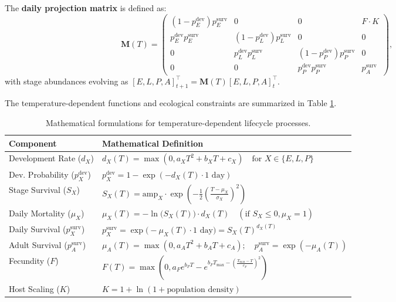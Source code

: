 \documentclass{article}
\begin{document}
The \textbf{daily projection matrix} is defined as:
\begin{equation}
\mathbf{M}(T) = 
\begin{pmatrix}
(1 - p_E^{\text{dev}}) p_E^{\text{surv}} & 0 & 0 & F \cdot K \\
p_E^{\text{dev}} p_E^{\text{surv}} & (1 - p_L^{\text{dev}}) p_L^{\text{surv}} & 0 & 0 \\
0 & p_L^{\text{dev}} p_L^{\text{surv}} & (1 - p_P^{\text{dev}}) p_P^{\text{surv}} & 0 \\
0 & 0 & p_P^{\text{dev}} p_P^{\text{surv}} & p_A^{\text{surv}}
\end{pmatrix},
\end{equation}
with stage abundances evolving as $[E,L,P,A]_{t+1}^\top = \mathbf{M}(T) [E,L,P,A]_t^\top$.

The temperature-dependent functions and ecological constraints are summarized in Table \ref{tab:lifecycle_equations}.

\begin{table}[!htb]
\centering
\caption{Mathematical formulations for temperature-dependent lifecycle processes.}
\label{tab:lifecycle_equations}
\begin{tabular}{@{}ll@{}}
\toprule
\textbf{Component} & \textbf{Mathematical Definition} \\ \midrule
Development Rate ($d_X$) & $d_X(T) = \max(0, a_X T^2 + b_X T + c_X) \quad \text{for } X \in \{E,L,P\}$ \\
Dev. Probability ($p_X^{\text{dev}}$) & $p_X^{\text{dev}} = 1 - \exp(-d_X(T) \cdot 1 \text{ day})$ \\
Stage Survival ($S_X$) & $S_X(T) = \text{amp}_X \cdot \exp\left(-\frac{1}{2}\left(\frac{T - \mu_X}{\sigma_X}\right)^2\right)$ \\
Daily Mortality ($\mu_X$) & $\mu_X(T) = -\ln\bigl(S_X(T)\bigr) \cdot d_X(T) \quad (\text{if } S_X \le 0, \mu_X = 1)$ \\
Daily Survival ($p_X^{\text{surv}}$) & $p_X^{\text{surv}} = \exp\bigl(-\mu_X(T) \cdot 1 \text{ day}\bigr) = S_X(T)^{d_X(T)}$ \\
Adult Survival ($p_A^{\text{surv}}$) & $\mu_A(T) = \max(0, a_A T^2 + b_A T + c_A); \quad p_A^{\text{surv}} = \exp(-\mu_A(T))$ \\
Fecundity ($F$) & $F(T) = \max\left(0, a_F e^{b_F T} - e^{b_F T_{\max} - \left(\frac{T_{\max}-T}{c_F}\right)^2}\right)$ \\
Host Scaling ($K$) & $K = 1 + \ln(1 + \text{population density})$ \\ 
\bottomrule
\end{tabular}
\end{table}
\end{document}
